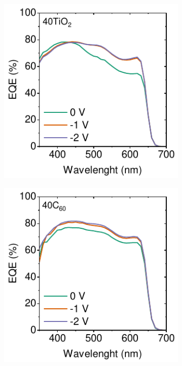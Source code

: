 \begin{figure}[ht!]
        \begin{subfigure}{0.32\textwidth}
        \centering
        \includegraphics[width=\textwidth]{chapters/transport_layers/images/EQE_40TiO2.pdf}
        \caption{}
        \label{}
    \end{subfigure}
    \hfill
    \begin{subfigure}{0.32\textwidth}
        \centering
        \includegraphics[width=\textwidth]{chapters/transport_layers/images/EQE_40C60.pdf}

\end{subfigure}
\end{figure}

